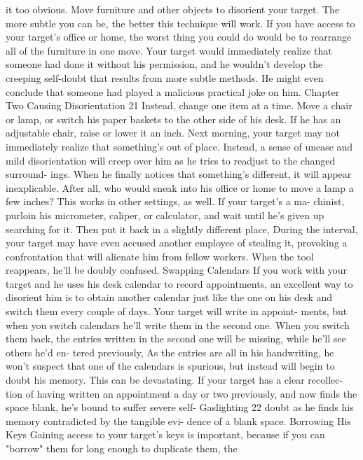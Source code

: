 \documentclass{book}
\begin{document}
it too obvious. 
Move furniture and other objects to disorient your target. 
The more subtle you can be, the better this technique will work. 
If you have access to your target's office or home, the worst 
thing you could do would be to rearrange all of the furniture in 
one move. Your target would immediately realize that someone 
had done it without his permission, and he wouldn't develop the 
creeping self-doubt that results from more subtle methods. He 
might even conclude that someone had played a malicious 
practical joke on him. 
Chapter Two 
Causing Disorientation 
21 
Instead, change one item at a time. Move a chair or lamp, or 
switch his paper baskets to the other side of his desk. If he has 
an adjustable chair, raise or lower it an inch. Next morning, 
your target may not immediately realize that something's out of 
place. Instead, a sense of unease and mild disorientation will 
creep over him as he tries to readjust to the changed surround- 
ings. When he finally notices that something's different, it will 
appear inexplicable. After all, who would sneak into his office 
or home to move a lamp a few inches? 
This works in other settings, as well. If your target's a ma- 
chinist, purloin his micrometer, caliper, or calculator, and wait 
until he's given up searching for it. Then put it back in a 
slightly different place, During the interval, your target may 
have even accused another employee of stealing it, provoking a 
confrontation that will alienate him from fellow workers. When 
the tool reappears, he'll be doubly confused. 
Swapping Calendars 
If you work with your target and he uses his desk calendar 
to record appointments, an excellent way to disorient him is to 
obtain another calendar just like the one on his desk and switch 
them every couple of days. Your target will write in appoint- 
ments, but when you switch calendars he'll write them in the 
second one. When you switch them back, the entries written in 
the second one will be missing, while he'll see others he'd en- 
tered previously, As the entries are all in his handwriting, he 
won't suspect that one of the calendars is spurious, but instead 
will begin to doubt his memory. 
This can be devastating. If your target has a clear recollec- 
tion of having written an appointment a day or two previously, 
and now finds the space blank, he's bound to suffer severe self-  Gaslighting 
22 
doubt as he finds his memory contradicted by the tangible evi- 
dence of a blank space. 
Borrowing His Keys 
Gaining access to your target's keys is important, because if 
you can "borrow" them for long enough to duplicate them, the 
\end{document}
